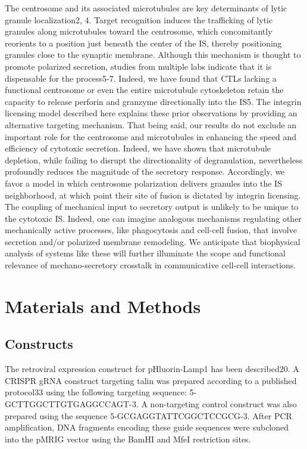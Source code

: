 The centrosome and its associated microtubules are key determinants of lytic granule localization2, 4. Target recognition induces the trafficking of lytic granules along microtubules toward the centrosome, which concomitantly reorients to a position just beneath the center of the IS, thereby positioning granules close to the synaptic membrane. Although this mechanism is thought to promote polarized secretion, studies from multiple labs indicate that it is dispensable for the process5-7. Indeed, we have found that CTLs lacking a functional centrosome or even the entire microtubule cytoskeleton retain the capacity to release perforin and granzyme directionally into the IS5. The integrin licensing model described here explains these prior observations by providing an alternative targeting mechanism. That being said, our results do not exclude an important role for the centrosome and microtubules in enhancing the speed and efficiency of cytotoxic secretion. Indeed, we have shown that microtubule depletion, while failing to disrupt the directionality of degranulation, nevertheless profoundly reduces the magnitude of the secretory response. Accordingly, we favor a model in which centrosome polarization delivers granules into the IS neighborhood, at which point their site of fusion is dictated by integrin licensing. The coupling of mechanical input to secretory output is unlikely to be unique to the cytotoxic IS. Indeed, one can imagine analogous mechanisms regulating other mechanically active processes, like phagocytosis and cell-cell fusion, that involve secretion and/or polarized membrane remodeling. We anticipate that biophysical analysis of systems like these will further illuminate the scope and functional relevance of mechano-secretory crosstalk in communicative cell-cell interactions.

\section{Materials and Methods}

\subsection{Constructs}
The retroviral expression construct for pHluorin-Lamp1 has been described20. A CRISPR gRNA construct targeting talin was prepared according to a published protocol33 using the following targeting sequence: 5\textquotesingle -GCTTGGCTTGTGAGGCCAGT-3\textquotesingle. A non-targeting control construct was also prepared using the sequence 5\textquotesingle -GCGAGGTATTCGGCTCCGCG-3\textquotesingle. After PCR amplification, DNA fragments encoding these guide sequences were subcloned into the pMRIG vector using the BamHI and MfeI restriction sites.

